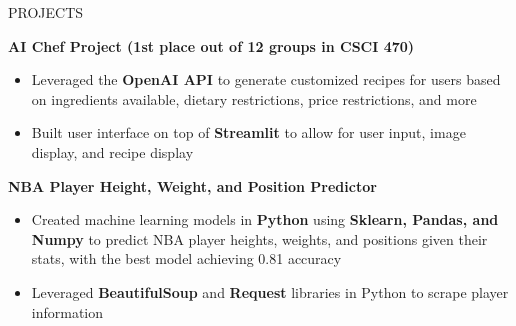 \documentclass{resume} %
\begin{document}
\begin{rSection}{PROJECTS}

\textbf{AI Chef Project (1st place out of 12 groups in CSCI 470)} \hfill %
\vspace{-6pt}
 \begin{itemize}[leftmargin=*]
    \itemsep -6pt {} 
     \item Leveraged the \textbf{OpenAI API} to generate customized recipes for users based on ingredients available, dietary restrictions, price restrictions, and more
     \item Built user interface on top of \textbf{Streamlit} to allow for user input, image display, and recipe display
 \end{itemize}

\textbf{NBA Player Height, Weight, and Position Predictor} %
\vspace{-6pt}
 \begin{itemize}[leftmargin=*]
    \itemsep -6pt {} 
     \item Created machine learning models in \textbf{Python} using \textbf{Sklearn, Pandas, and Numpy} to predict NBA player heights, weights, and positions given their stats, with the best model achieving 0.81 accuracy
     \item Leveraged \textbf{BeautifulSoup} and \textbf{Request} libraries in Python to scrape player information
 \end{itemize}


%
 

\end{rSection}
\end{document}
